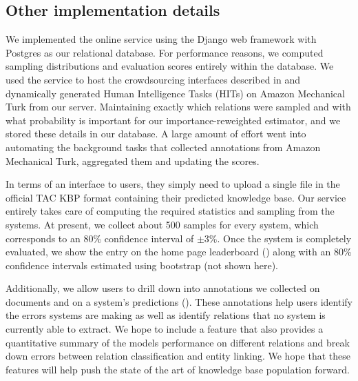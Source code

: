 \subsection{Other implementation details}
We implemented the online service using the Django web framework with Postgres as our relational database.
For performance reasons, we computed sampling distributions and evaluation scores entirely within the database.
We used the service to host the crowdsourcing interfaces described in  and dynamically generated Human Intelligence Tasks (HITs) on Amazon Mechanical Turk from our server.
Maintaining exactly which relations were sampled and with what probability is important for our importance-reweighted estimator, and we stored these details in our database.
A large amount of effort went into automating the background tasks that collected annotations from Amazon Mechanical Turk, aggregated them and updating the scores.

In terms of an interface to users, they simply need to upload a single file in the official TAC KBP format containing their predicted knowledge base.
Our service entirely takes care of computing the required statistics and sampling from the systems.
At present, we collect about 500 samples for every system, which corresponds to an 80\% confidence interval of $\pm 3\%$.
Once the system is completely evaluated, we show the entry on the home page leaderboard () along with an 80\% confidence intervals estimated using bootstrap (not shown here).

Additionally, we allow users to drill down into annotations we collected on documents and on a system's predictions ().
These annotations help users identify the errors systems are making as well as identify relations that no system is currently able to extract.
We hope to include a feature that also provides a quantitative summary of the models performance on different relations and break down errors between relation classification and entity linking.
We hope that these features will help push the state of the art of knowledge base population forward.

